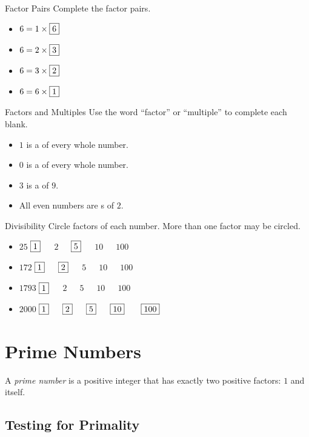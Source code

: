 \documentclass[a4paper,10pt]{report}
\begin{document}
\begin{problem}{Factor Pairs}
 Complete the factor pairs.

 \begin{itemize}
  \item $6 = 1 \times \Ans{6}$
  \item $6 = 2 \times \Ans{3}$
  \item $6 = 3 \times \Ans{2}$
  \item $6 = 6 \times \Ans{1}$
 \end{itemize}
\end{problem}

\begin{problem}{Factors and Multiples}
 Use the word ``factor'' or ``multiple'' to complete each blank.

 \begin{itemize}
  \item $1$ is a  of every whole number.
  \item $0$ is a  of every whole number.
  \item $3$ is a  of $9$.
  \item All even numbers are s of $2$.
 \end{itemize}
\end{problem}

\begin{problem}{Divisibility}
 Circle factors of each number. More than one factor may be circled.

 \begin{itemize}
  \item $25$ \hfill $\Ans{1}$~~~$2$~~~$\Ans{5}$~~~$10$~~~$100$
  \item $172$ \hfill $\Ans{1}$~~~$\Ans{2}$~~~$5$~~~$10$~~~$100$
  \item $1793$ \hfill $\Ans{1}$~~~$2$~~~$5$~~~$10$~~~$100$
  \item $2000$ \hfill $\Ans{1}$~~~$\Ans{2}$~~~$\Ans{5}$~~~$\Ans{10}$
  ~~~$\Ans{100}$
 \end{itemize}
\end{problem}

\chapter{Prime Numbers}

A \emph{prime number} is a positive integer that has exactly two positive
factors: $1$ and itself.

\section{Testing for Primality}
\end{document}
